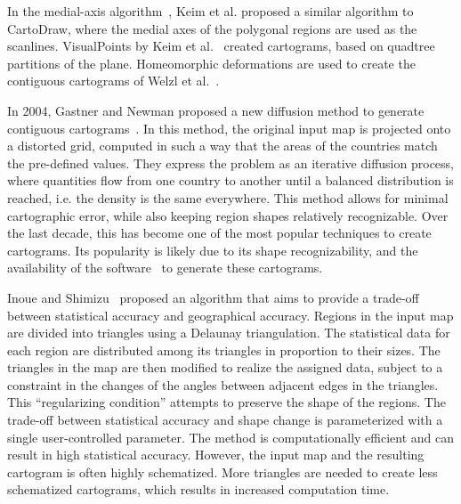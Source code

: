 \documentclass{egpubl}
\begin{document}
 
In the medial-axis algorithm~\cite{KPN05}, Keim et al. proposed a similar algorithm to CartoDraw, where the medial axes of the polygonal regions are used as the scanlines. VisualPoints by Keim et al.~\cite{KNPS03} created cartograms, based on quadtree partitions of the plane. Homeomorphic deformations are used to create the contiguous cartograms of Welzl et al.~\cite{edelsbrunner1995combinatorial}.  


In 2004, Gastner and Newman proposed a new diffusion method to generate contiguous cartograms~\cite{GN04}. In this method, the original input map is projected onto a distorted grid, computed in such a way that the areas of the countries match the pre-defined values. They express the problem as an iterative diffusion process, where quantities flow from one country to another until a balanced distribution is reached, i.e. the density is the same everywhere. 
This method allows for minimal cartographic error, while also keeping region shapes relatively recognizable. Over the last decade, this has become one of the most popular techniques to create cartograms. Its popularity is likely due to its shape recognizability, and the availability of the software~\cite{carto_sw} to generate these cartograms. 

\begin{comment}
{\color{red}Inoue and Shimizu~\cite{inoue2006new} proposed an algorithm that aims to provide good geographical accuracy. 
Regions in the input map are first divided into triangles using Delaunay triangulation. These triangles are modified to realize data, with a regularization condition that constrains the changes in the bearings of the triangle edges. The method is user-friendly, and results in high statistical accuracy. However, since it uses Delaunay triangulation, the resulting cartogram is highly schematized. For creating a cartogram with more detailed shape, large computation time is required.}
\end{comment}

Inoue and Shimizu~\cite{inoue2006new} proposed an algorithm that aims to provide a trade-off between statistical accuracy and geographical accuracy.
Regions in the input map are divided into triangles using a Delaunay triangulation. The statistical data for each region are distributed among its triangles in proportion to their sizes. The triangles in the map are then modified to realize the assigned data, subject to a constraint in the changes of the angles between adjacent edges in the triangles. This ``regularizing condition'' attempts to preserve the shape of the regions.  The trade-off between statistical accuracy and shape change is parameterized with a single user-controlled parameter. The method is computationally efficient and can result in high statistical accuracy.
However, the input map and the resulting cartogram is often highly schematized. More triangles are needed to create less schematized cartograms, which results in increased computation time.
\end{document}
